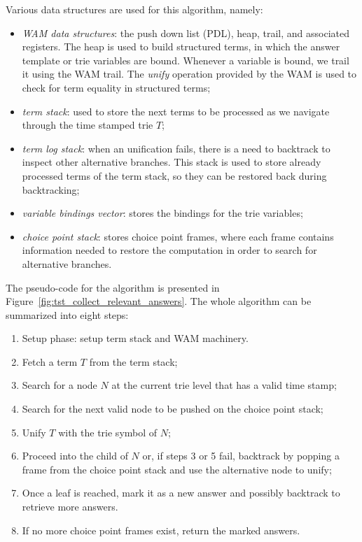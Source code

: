 Various data structures are used for this algorithm, namely:

\begin{itemize}
  \item \textit{WAM data structures}: the push down list (PDL),
  heap, trail, and associated registers. The heap is used to build structured terms, in which the
  answer template or trie variables are bound. Whenever a variable is bound, we trail it using the WAM trail. The \textit{unify} operation provided by the WAM is used to check for term equality in structured terms;
  
  \item \textit{term stack}: used to store the next terms to be processed as we navigate through the time
   stamped trie $T$;
  
  \item \textit{term log stack}: when an unification fails, there is a need to backtrack to inspect other
  alternative branches. This stack is used to store already processed terms of the term stack,
  so they can be restored back during backtracking;
  
  \item \textit{variable bindings vector}: stores the bindings for the trie variables;
  
  \item \textit{choice point stack}: stores choice point frames, where each frame contains
  information needed to restore the computation in order to search for alternative branches.
\end{itemize}

The pseudo-code for the algorithm is presented in Figure~\ref{fig:tst_collect_relevant_answers}.
The whole algorithm can be summarized into eight steps:

\begin{enumerate}
  \item Setup phase: setup term stack and WAM machinery.
  \item Fetch a term $T$ from the term stack;
  \item Search for a node $N$ at the current trie level that has a valid time stamp;
  \item Search for the next valid node to be pushed on the choice point stack;
  \item Unify $T$ with the trie symbol of $N$;
  \item Proceed into the child of $N$ or, if steps 3 or 5 fail, backtrack by popping a frame from the choice point stack and use the alternative node to unify;
  \item Once a leaf is reached, mark it as a new answer and possibly backtrack to retrieve more answers.
  \item If no more choice point frames exist, return the marked answers.
\end{enumerate}

